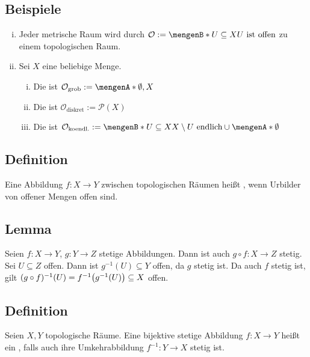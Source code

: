 \subsection[Beispiele für Topologien]{Beispiele} %
\label{sub:19}
\begin{enumerate}[(i)]
	\item Jeder metrische Raum wird durch 
	\(
		\mathcal{O} := \set[U \subseteq X]{U \text{ ist offen}} 
	\)
	zu einem topologischen Raum.
	\item Sei $X$ eine beliebige Menge.
	\begin{enumerate}[(i)]
		\item Die  ist $\mathcal{O}_{\text{grob}} := \set{\emptyset, X} $
		\item Die  ist $\mathcal{O}_{\text{diskret}} := \mathcal{P}(X)$
		\item Die   ist 
		$\mathcal{O}_{\text{koendl.}} := \set[U \subseteq X]{X \setminus U \text{ endlich}} \cup \set{\emptyset}$
	\end{enumerate}
\end{enumerate}

\subsection[Definition: Stetigkeit in topologischen Räumen]{Definition} %
\label{sub:110}
Eine Abbildung $f :X \to Y$ zwischen topologischen Räumen heißt , wenn Urbilder von offener Mengen offen sind.

\subsection[Lemma: Kompositionen stetiger Abbildungen sind stetig]{Lemma} %
\label{sub:111}
Seien $f : X \to Y$, $g : Y \to Z$ stetige Abbildungen. Dann ist auch $g \circ f : X \to Z$ stetig.
Sei $U \subseteq Z$ offen. Dann ist $g ^{-1}(U) \subseteq Y$ offen, da $g$ stetig ist. Da auch $f$ stetig ist, gilt 
$\enbrace{g \circ f } ^{-1} (U) = f ^{-1} \enbrace[\big]{g ^{-1} (U)} \subseteq  X$ offen. \bewende

\subsection[Definition: Homöomorphismus]{Definition} %
\label{sub:112}
Seien $X,Y$ topologische Räume. Eine bijektive stetige Abbildung $f : X \to Y$ heißt ein , falls auch ihre Umkehrabbildung  $f ^{-1} : Y \to X$ 
stetig ist.

